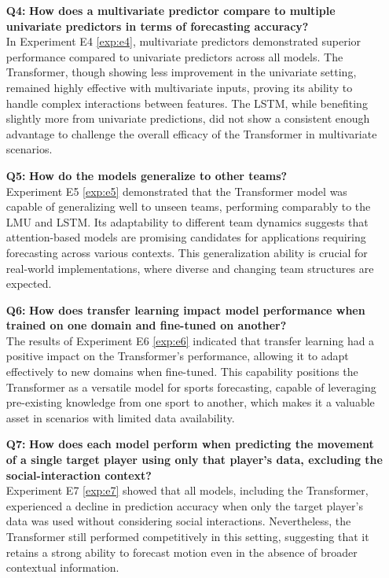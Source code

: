 \begin{itemize}
    \item[\textbf{Q4:}] \textbf{How does a multivariate predictor compare to multiple univariate predictors in terms of forecasting accuracy?} \\
    In Experiment E4 \ref{exp:e4}, multivariate predictors demonstrated superior performance compared to univariate predictors across all models. The Transformer, though showing less improvement in the univariate setting, remained highly effective with multivariate inputs, proving its ability to handle complex interactions between features. The LSTM, while benefiting slightly more from univariate predictions, did not show a consistent enough advantage to challenge the overall efficacy of the Transformer in multivariate scenarios.

    \item[\textbf{Q5:}] \textbf{How do the models generalize to other teams?} \\
    Experiment E5 \ref{exp:e5} demonstrated that the Transformer model was capable of generalizing well to unseen teams, performing comparably to the LMU and LSTM. Its adaptability to different team dynamics suggests that attention-based models are promising candidates for applications requiring forecasting across various contexts. This generalization ability is crucial for real-world implementations, where diverse and changing team structures are expected.

    \item[\textbf{Q6:}] \textbf{How does transfer learning impact model performance when trained on one domain and fine-tuned on another?} \\
    The results of Experiment E6 \ref{exp:e6} indicated that transfer learning had a positive impact on the Transformer’s performance, allowing it to adapt effectively to new domains when fine-tuned. This capability positions the Transformer as a versatile model for sports forecasting, capable of leveraging pre-existing knowledge from one sport to another, which makes it a valuable asset in scenarios with limited data availability.

    \item[\textbf{Q7:}] \textbf{How does each model perform when predicting the movement of a single target player using only that player’s data, excluding the social-interaction context?} \\
    Experiment E7 \ref{exp:e7} showed that all models, including the Transformer, experienced a decline in prediction accuracy when only the target player's data was used without considering social interactions. Nevertheless, the Transformer still performed competitively in this setting, suggesting that it retains a strong ability to forecast motion even in the absence of broader contextual information.
\end{itemize}
\newpage
